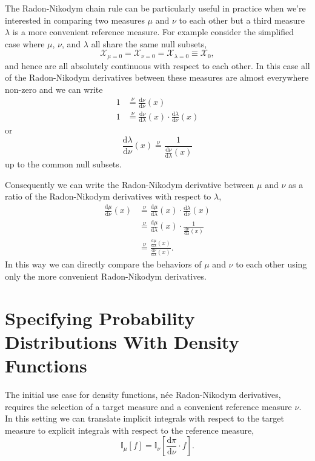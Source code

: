 \documentclass[
  letterpaper,
  DIV=11,
  numbers=noendperiod]{scrartcl}
\begin{document}
The Radon-Nikodym chain rule can be particularly useful in practice when
we're interested in comparing two measures \(\mu\) and \(\nu\) to each
other but a third measure \(\lambda\) is a more convenient reference
measure. For example consider the simplified case where \(\mu\),
\(\nu\), and \(\lambda\) all share the same null subsets, \[
  \mathcal{X}_{\mu = 0}
= \mathcal{X}_{\nu = 0}
= \mathcal{X}_{\lambda = 0}
\equiv \mathcal{X}_{0},
\] and hence are all absolutely continuous with respect to each other.
In this case all of the Radon-Nikodym derivatives between these measures
are almost everywhere non-zero and we can write \begin{align*}
1
&\overset{\nu}{=}
\frac{ \mathrm{d} \nu}{ \mathrm{d} \nu}(x)
\\
1
&\overset{\nu}{=}
\frac{ \mathrm{d} \nu}{ \mathrm{d} \lambda }(x) \cdot
\frac{ \mathrm{d} \lambda}{ \mathrm{d} \nu }(x)
\end{align*} or \[
\frac{ \mathrm{d} \lambda}{ \mathrm{d} \nu }(x)
\overset{\nu}{=}
\frac{1}{ \frac{ \mathrm{d} \nu}{ \mathrm{d} \lambda }(x) }
\] up to the common null subsets.

Consequently we can write the Radon-Nikodym derivative between \(\mu\)
and \(\nu\) as a ratio of the Radon-Nikodym derivatives with respect to
\(\lambda\), \begin{align*}
\frac{ \mathrm{d} \mu}{ \mathrm{d} \nu}(x)
&\overset{\nu}{=}
\frac{ \mathrm{d} \mu}{ \mathrm{d} \lambda }(x) \cdot
\frac{ \mathrm{d} \lambda}{ \mathrm{d} \nu }(x)
\\
&\overset{\nu}{=}
\frac{ \mathrm{d} \mu}{ \mathrm{d} \lambda }(x) \cdot
\frac{1}{ \frac{ \mathrm{d} \nu}{ \mathrm{d} \lambda }(x) }
\\
&\overset{\nu}{=}
\frac{ \frac{ \mathrm{d} \mu}{ \mathrm{d} \lambda }(x) }
{ \frac{ \mathrm{d} \nu}{ \mathrm{d} \lambda }(x) }.
\end{align*} In this way we can directly compare the behaviors of
\(\mu\) and \(\nu\) to each other using only the more convenient
Radon-Nikodym derivatives.

\hypertarget{specifying-probability-distributions-with-density-functions}{%
\section{Specifying Probability Distributions With Density
Functions}\label{specifying-probability-distributions-with-density-functions}}

The initial use case for density functions, née Radon-Nikodym
derivatives, requires the selection of a target measure and a convenient
reference measure \(\nu\). In this setting we can translate implicit
integrals with respect to the target measure to explicit integrals with
respect to the reference measure, \[
\mathbb{I}_{\mu}[f] =
\mathbb{I}_{\nu}
\left[ \frac{ \mathrm{d} \pi}{ \mathrm{d} \nu } \cdot f \right].
\]
\end{document}
